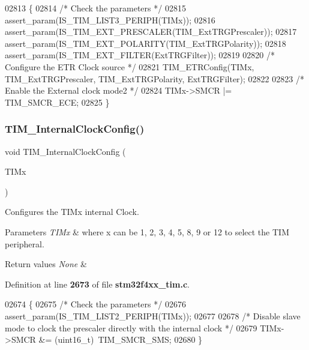 \begin{DoxyCode}
02813 \{
02814   \textcolor{comment}{/* Check the parameters */}
02815   assert_param(IS_TIM_LIST3_PERIPH(TIMx));
02816   assert_param(IS_TIM_EXT_PRESCALER(TIM\_ExtTRGPrescaler));
02817   assert_param(IS_TIM_EXT_POLARITY(TIM\_ExtTRGPolarity));
02818   assert_param(IS_TIM_EXT_FILTER(ExtTRGFilter));
02819 
02820   \textcolor{comment}{/* Configure the ETR Clock source */}
02821   TIM_ETRConfig(TIMx, TIM\_ExtTRGPrescaler, TIM\_ExtTRGPolarity, ExtTRGFilter);
02822 
02823   \textcolor{comment}{/* Enable the External clock mode2 */}
02824   TIMx->SMCR |= TIM_SMCR_ECE;
02825 \}
\end{DoxyCode}
\mbox{\label{group__TIM__Group6_ga2394f0221709c0659874f9a4184cf86e}} 
\subsubsection{T\+I\+M\+\_\+\+Internal\+Clock\+Config()}
{\footnotesize\ttfamily void T\+I\+M\+\_\+\+Internal\+Clock\+Config (\begin{DoxyParamCaption}\item[{\textbf{ T\+I\+M\+\_\+\+Type\+Def} $\ast$}]{T\+I\+Mx }\end{DoxyParamCaption})}



Configures the T\+I\+Mx internal Clock. 


\begin{DoxyParams}{Parameters}
{\em T\+I\+Mx} & where x can be 1, 2, 3, 4, 5, 8, 9 or 12 to select the T\+IM peripheral. \\
\hline
\end{DoxyParams}

\begin{DoxyRetVals}{Return values}
{\em None} & \\
\hline
\end{DoxyRetVals}


Definition at line \textbf{ 2673} of file \textbf{ stm32f4xx\+\_\+tim.\+c}.


\begin{DoxyCode}
02674 \{
02675   \textcolor{comment}{/* Check the parameters */}
02676   assert_param(IS_TIM_LIST2_PERIPH(TIMx));
02677 
02678   \textcolor{comment}{/* Disable slave mode to clock the prescaler directly with the internal clock */}
02679   TIMx->SMCR &=  (uint16\_t)~TIM_SMCR_SMS;
02680 \}
\end{DoxyCode}
\mbox{\label{group__TIM__Group6_gabef227d21d9e121e6a4ec5ab6223f5a9}} 
